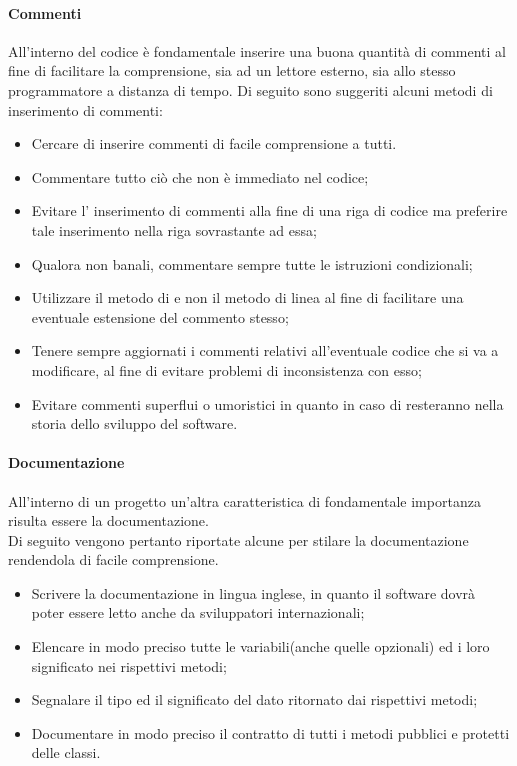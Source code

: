 \paragraph{Commenti}
All'interno del codice è fondamentale inserire una buona quantità di commenti al fine di facilitare la comprensione, sia ad un lettore esterno, sia allo stesso programmatore a distanza di tempo.
Di seguito sono suggeriti alcuni metodi di inserimento di commenti:

\begin{itemize}
\item Cercare di inserire commenti di facile comprensione a tutti.

\item Commentare tutto ciò che non è immediato nel codice;

\item Evitare l' inserimento di commenti alla fine di una riga di codice ma preferire tale inserimento nella riga sovrastante ad essa;

\item Qualora non banali, commentare sempre tutte le istruzioni condizionali;

\item Utilizzare il metodo di  e non il metodo di linea al fine di facilitare una eventuale estensione del commento stesso;

\item Tenere sempre aggiornati i commenti relativi all'eventuale codice che si va a modificare, al fine di evitare problemi di inconsistenza con esso;

\item Evitare commenti superflui o umoristici in quanto in caso di  resteranno nella storia dello sviluppo del software.
\end{itemize}

\paragraph{Documentazione}
All'interno di un progetto  un'altra caratteristica di fondamentale importanza risulta essere la documentazione. \\
Di seguito vengono pertanto riportate alcune  per stilare la documentazione rendendola di facile comprensione.

\begin{itemize}
\item Scrivere la documentazione in lingua inglese, in quanto il software dovrà poter essere letto anche da sviluppatori internazionali;
\item Elencare in modo preciso tutte le variabili(anche quelle opzionali) ed i loro significato nei rispettivi metodi;
\item Segnalare il tipo ed il significato del dato ritornato dai rispettivi metodi;
\item Documentare in modo preciso il contratto di tutti i metodi pubblici e protetti delle classi.
\end{itemize}

